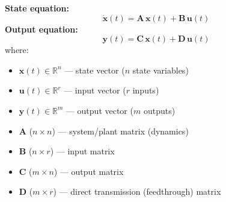 \documentclass[12pt,a4paper]{article}
\begin{document}
\begin{tcolorbox}[formulabox, title={Standard State Space Form}]
\textbf{State equation:}
$$\dot{\mathbf{x}}(t) = \mathbf{A}\,\mathbf{x}(t) + \mathbf{B}\,\mathbf{u}(t)$$
\textbf{Output equation:}
$$\mathbf{y}(t) = \mathbf{C}\,\mathbf{x}(t) + \mathbf{D}\,\mathbf{u}(t)$$
where:
\begin{itemize}[leftmargin=*, itemsep=2pt, topsep=2pt]
  \item $\mathbf{x}(t) \in \mathbb{R}^n$ --- state vector ($n$ state variables)
  \item $\mathbf{u}(t) \in \mathbb{R}^r$ --- input vector ($r$ inputs)
  \item $\mathbf{y}(t) \in \mathbb{R}^m$ --- output vector ($m$ outputs)
  \item $\mathbf{A}$ ($n\times n$) --- system/plant matrix (dynamics)
  \item $\mathbf{B}$ ($n\times r$) --- input matrix
  \item $\mathbf{C}$ ($m\times n$) --- output matrix
  \item $\mathbf{D}$ ($m\times r$) --- direct transmission (feedthrough) matrix
\end{itemize}
\end{tcolorbox}
\end{document}
